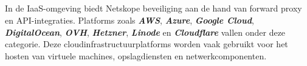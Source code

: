     
    
    

\subsection{}
\label{subsubsec:iaas-poc}

In de IaaS-omgeving biedt Netskope beveiliging aan de hand van forward proxy en API-integraties. 
Platforms zoals \textbf{\textit{AWS}}, \textbf{\textit{Azure}}, \textbf{\textit{Google Cloud}}, \textbf{\textit{DigitalOcean}}, \textbf{\textit{OVH}}, \textbf{\textit{Hetzner}}, \textbf{\textit{Linode}} 
en \textbf{\textit{Cloudflare}} vallen onder deze categorie. Deze cloudinfrastructuurplatforms worden vaak gebruikt voor het hosten van virtuele machines, opslagdiensten en netwerkcomponenten.





\subsection{}
\label{subsubsec:email-poc}

